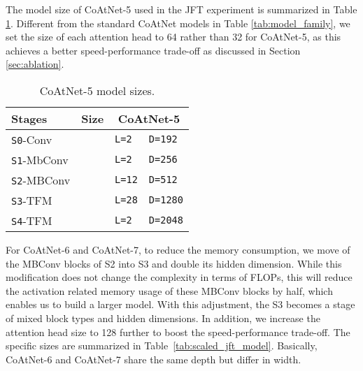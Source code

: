 \documentclass{article}
\newcommand{\name}{CoAtNet\xspace}
\begin{document}
The model size of \name-5 used in the JFT experiment is summarized in Table \ref{tab:jft_model}.
Different from the standard \name models in Table \ref{tab:model_family}, we set the size of each attention head to 64 rather than 32 for \name-5, as this achieves a better speed-performance trade-off as discussed in Section \ref{sec:ablation}.
\begin{table}[!ht]
    \centering
    \caption{\name-5 model sizes.}
    \begin{tabular}{l|c|ll}
    \toprule
    \bf Stages & \bf Size 
    & \multicolumn{2}{c}{\bf \name-5} \\
    \midrule
    \texttt{S0}-Conv &               
        & \texttt{L=2} & \texttt{D=192} \\
    \texttt{S1}-MbConv &               
        & \texttt{L=2} & \texttt{D=256} \\
    \texttt{S2}-MBConv &             
        & \texttt{L=12} & \texttt{D=512} \\
    \texttt{S3}-TFM &  
        & \texttt{L=28}  & \texttt{D=1280} \\
    \texttt{S4}-TFM &  
        & \texttt{L=2} & \texttt{D=2048} \\
    \bottomrule
    \end{tabular}
    \label{tab:jft_model}
\end{table}

For CoAtNet-6 and CoAtNet-7, to reduce the memory consumption, we move  of the MBConv blocks of S2 into S3 and double its hidden dimension.
While this modification does not change the complexity in terms of FLOPs, this will reduce the activation related memory usage of these MBConv blocks by half, which enables us to build a larger model.
With this adjustment, the S3 becomes a stage of mixed block types and hidden dimensions. 
In addition, we increase the attention head size to 128 further to boost the speed-performance trade-off.
The specific sizes are summarized in Table~\ref{tab:scaled_jft_model}.
Basically, CoAtNet-6 and CoAtNet-7 share the same depth but differ in width.
\end{document}

